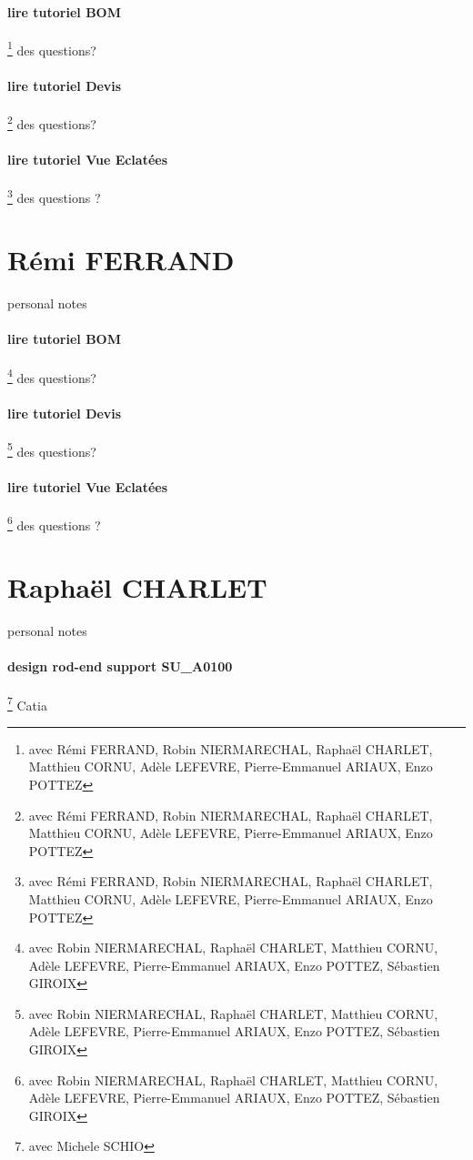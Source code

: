\paragraph{lire tutoriel BOM} \footnote{avec Rémi FERRAND, Robin NIERMARECHAL, Raphaël CHARLET, Matthieu CORNU, Adèle LEFEVRE, Pierre-Emmanuel ARIAUX, Enzo POTTEZ} des questions?
\paragraph{lire tutoriel Devis} \footnote{avec Rémi FERRAND, Robin NIERMARECHAL, Raphaël CHARLET, Matthieu CORNU, Adèle LEFEVRE, Pierre-Emmanuel ARIAUX, Enzo POTTEZ} des questions?
\paragraph{lire tutoriel Vue Eclatées} \footnote{avec Rémi FERRAND, Robin NIERMARECHAL, Raphaël CHARLET, Matthieu CORNU, Adèle LEFEVRE, Pierre-Emmanuel ARIAUX, Enzo POTTEZ} des questions ?
\newpage \section*{Rémi FERRAND} 
 \par personal notes
\paragraph{lire tutoriel BOM} \footnote{avec Robin NIERMARECHAL, Raphaël CHARLET, Matthieu CORNU, Adèle LEFEVRE, Pierre-Emmanuel ARIAUX, Enzo POTTEZ, Sébastien GIROIX} des questions?
\paragraph{lire tutoriel Devis} \footnote{avec Robin NIERMARECHAL, Raphaël CHARLET, Matthieu CORNU, Adèle LEFEVRE, Pierre-Emmanuel ARIAUX, Enzo POTTEZ, Sébastien GIROIX} des questions?
\paragraph{lire tutoriel Vue Eclatées} \footnote{avec Robin NIERMARECHAL, Raphaël CHARLET, Matthieu CORNU, Adèle LEFEVRE, Pierre-Emmanuel ARIAUX, Enzo POTTEZ, Sébastien GIROIX} des questions ?
\newpage \section*{Raphaël CHARLET} 
 \par personal notes
\paragraph{design rod-end support SU\_A0100} \footnote{avec Michele SCHIO} Catia

